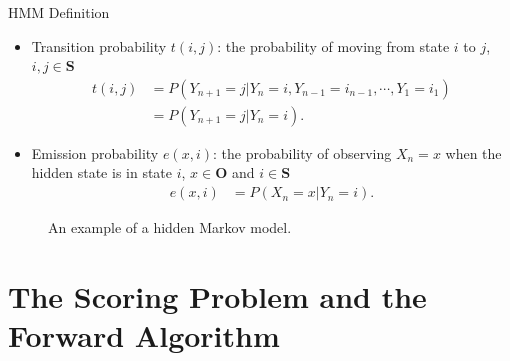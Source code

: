\documentclass{beamer}
\begin{document}
\begin{frame}{HMM Definition}
	\begin{itemize}
		\item Transition probability $t(i,j)$: the probability of moving from state $i$ to $j$, $i,j \in \textbf{S}$
		\begin{equation}
			\begin{split}
				t(i,j) & = P(Y_{n+1} = j \vert Y_n = i, Y_{n-1} = i_{n-1},\cdots, Y_1 = i_1) \\
				& = P(Y_{n+1} = j \vert Y_n = i).
			\end{split}
		\end{equation}
		\item Emission probability $e(x,i)$: the probability of observing $X_n = x$ when the hidden state is in state $i$, $x \in \textbf{O}$ and $i \in \textbf{S}$
		\begin{equation}
			\begin{split}
				e(x, i)
				& = P(X_n = x \vert Y_n = i) .
			\end{split}
		\end{equation}
	\end{itemize}
	\begin{figure}
		\centering
		\caption{An example of a hidden Markov model.}
		\label{fig:HiddenMarkov}
	\end{figure}
\end{frame}
\section{The Scoring Problem and the Forward Algorithm}
\end{document}
